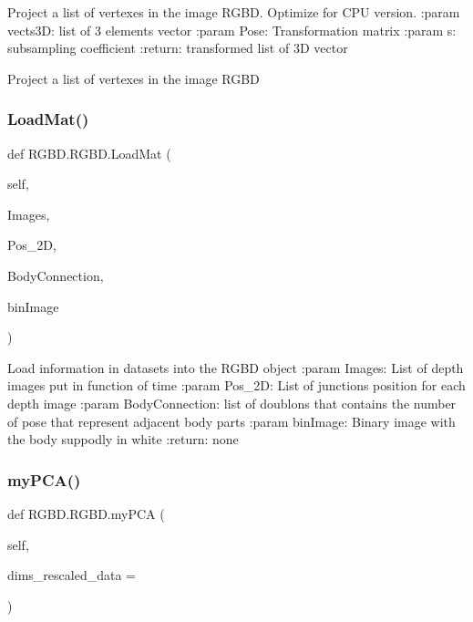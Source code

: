 \begin{DoxyVerb}Project a list of vertexes in the image RGBD. Optimize for CPU version.
:param vects3D: list of 3 elements vector
:param Pose: Transformation matrix
:param s: subsampling coefficient
:return: transformed list of 3D vector
\end{DoxyVerb}
\begin{DoxyVerb}Project a list of vertexes in the image RGBD\end{DoxyVerb}
 \mbox{\label{class_r_g_b_d_1_1_r_g_b_d_accb9314bc9a43859adbcbb85283e3722}} 
\subsubsection{Load\+Mat()}
{\footnotesize\ttfamily def R\+G\+B\+D.\+R\+G\+B\+D.\+Load\+Mat (\begin{DoxyParamCaption}\item[{}]{self,  }\item[{}]{Images,  }\item[{}]{Pos\+\_\+2D,  }\item[{}]{Body\+Connection,  }\item[{}]{bin\+Image }\end{DoxyParamCaption})}

\begin{DoxyVerb}Load information in datasets into the RGBD object
:param Images: List of depth images put in function of time
:param Pos_2D: List of junctions position for each depth image
:param BodyConnection: list of doublons that contains the number of pose that represent adjacent body parts
:param binImage: Binary image with the body suppodly in white
:return:  none
\end{DoxyVerb}
 \mbox{\label{class_r_g_b_d_1_1_r_g_b_d_a62a33614ece39d6ddd215f9faae0bc4d}} 
\subsubsection{my\+P\+C\+A()}
{\footnotesize\ttfamily def R\+G\+B\+D.\+R\+G\+B\+D.\+my\+P\+CA (\begin{DoxyParamCaption}\item[{}]{self,  }\item[{}]{dims\+\_\+rescaled\+\_\+data = {} }\end{DoxyParamCaption})}

